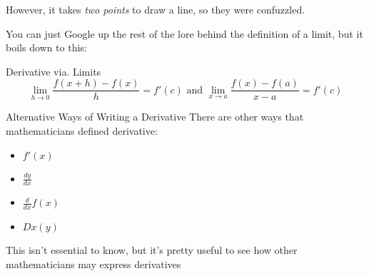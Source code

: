 \documentclass{MathNotes}
\begin{document}
\begin{center}
\end{center}

However, it takes \textit{two points} to draw a line, so they were confuzzled.

You can just Google up the rest of the lore behind the definition of a limit, 
but it boils down to this:
\begin{theorem}{Derivative via. Limits}
    \begin{displaymath}
        \lim_{h\to 0}\frac{f(x+h)-f(x)}{h}=f'(c)\text{ and }
        \lim_{x\to a}\frac{f(x)-f(a)}{x-a}=f'(c)
    \end{displaymath}
\end{theorem}

\begin{note}{Alternative Ways of Writing a Derivative}
There are other ways that mathematicians defined derivative:
\begin{multicols}{2}[]
    \begin{itemize}
        \item $f'(x)$
        \item $\frac{dy}{dx}$
        \item $\frac{d}{dx}f(x)$
        \item $Dx(y)$
    \end{itemize}
\end{multicols}
This isn't essential to know, but it's pretty useful to see how other
mathematicians may express derivatives
\end{note}
\end{document}
